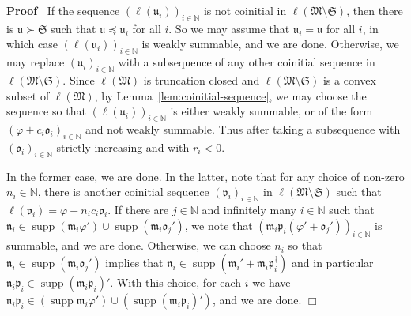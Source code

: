 \documentclass[10pt,a4paper]{amsart}
\newenvironment{proof}{\noindent\textbf{Proof\ }}{\hspace*{\fill}$\Box$\medskip}
\newcommand{\tmop}[1]{\ensuremath{\operatorname{#1}}}
\begin{document}
\begin{proof}
  If the sequence $(\ell (\mathfrak{u}_i))_{i \in \mathbb{N}}$ is not
  coinitial in $\ell (\mathfrak{M} \setminus \mathfrak{S})$, then there is
  $\mathfrak{u} \succ \mathfrak{S}$ such that $\mathfrak{u} \preccurlyeq
  \mathfrak{u}_i$ for all $i$. So we may assume that $\mathfrak{u}_i
  =\mathfrak{u}$ for all $i$, in which case $(\ell (\mathfrak{u}_i))_{i \in
  \mathbb{N}}$ is weakly summable, and we are done. Otherwise, we may replace
  $(\mathfrak{u}_i)_{i \in \mathbb{N}}$ with a subsequence of any other
  coinitial sequence in $\ell (\mathfrak{M} \setminus \mathfrak{S})$. Since
  $\ell (\mathfrak{M})$ is truncation closed and $\ell (\mathfrak{M} \setminus
  \mathfrak{S})$ is a convex subset of $\ell (\mathfrak{M})$, by
  Lemma~\ref{lem:coinitial-sequence}, we may choose the sequence so that $(\ell
  (\mathfrak{u}_i))_{i \in \mathbb{N}}$ is either weakly summable, or of the
  form $(\varphi + c_i \mathfrak{o}_i)_{i \in \mathbb{N}}$ and not weakly
  summable. Thus after taking a subsequence with $(\mathfrak{o}_i)_{i \in
  \mathbb{N}}$ strictly increasing and with $r_i < 0$.
  
  In the former case, we are done. In the latter, note that for any choice of
  non-zero $n_i \in \mathbb{N}$, there is another coinitial sequence
  $(\mathfrak{v}_i)_{i \in \mathbb{N}}$ in $\ell (\mathfrak{M} \setminus
  \mathfrak{S})$ such that $\ell (\mathfrak{v}_i) = \varphi + n_i c_i
  \mathfrak{o}_i$. If there are $j \in \mathbb{N}$ and infinitely many $i \in
  \mathbb{N}$ such that $\mathfrak{n}_i \in \tmop{supp} (\mathfrak{m}_i
  \varphi') \cup \tmop{supp} (\mathfrak{m}_i \mathfrak{o}_j')$, we note that
  $(\mathfrak{m}_i \mathfrak{p}_i  (\varphi' +\mathfrak{o}_j'))_{i \in
  \mathbb{N}}$ is summable, and we are done. Otherwise, we can choose $n_i$ so
  that $\mathfrak{n}_i \in \tmop{supp} (\mathfrak{m}_i \mathfrak{o}_j')$
  implies that $\mathfrak{n}_i \in \tmop{supp} (\mathfrak{m}_i'
  +\mathfrak{m}_i \mathfrak{p}_i^{\dag})$ and in particular $\mathfrak{n}_i
  \mathfrak{p}_i \in \tmop{supp} (\mathfrak{m}_i \mathfrak{p}_i)'$. With this
  choice, for each $i$ we have $\mathfrak{n}_i \mathfrak{p}_i \in (\tmop{supp}
  \mathfrak{m}_i \varphi') \cup (\tmop{supp} (\mathfrak{m}_i
  \mathfrak{p}_i)')$, and we are done.
\end{proof}
\end{document}
